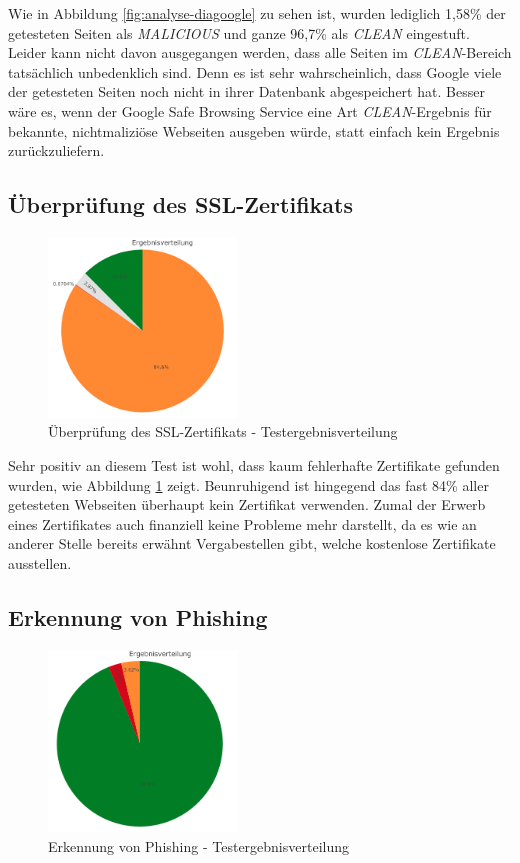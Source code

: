 Wie in Abbildung \ref{fig:analyse-diagoogle} zu sehen ist, wurden lediglich 1,58\% der
getesteten Seiten als \textit{MALICIOUS} und ganze 96,7\% als \textit{CLEAN} eingestuft.
Leider kann nicht davon ausgegangen werden, dass alle Seiten im \textit{CLEAN}-Bereich tatsächlich unbedenklich sind.
Denn es ist sehr wahrscheinlich, dass Google viele der getesteten Seiten noch nicht in ihrer Datenbank abgespeichert hat.
Besser wäre es, wenn der Google Safe Browsing Service eine Art \textit{CLEAN}-Ergebnis für bekannte, nichtmaliziöse Webseiten ausgeben würde, statt einfach kein Ergebnis zurückzuliefern. 

\subsection{Überprüfung des SSL-Zertifikats}
\begin{figure}[H]
  \centering
  \includegraphics[width=5cm]{images/stats/diacertificate}
  \caption{Überprüfung des SSL-Zertifikats - Testergebnisverteilung}
  \label{fig:analyse-diacertificate}
\end{figure}

Sehr positiv an diesem Test ist wohl, dass kaum fehlerhafte Zertifikate gefunden wurden, wie
Abbildung \ref{fig:analyse-diacertificate} zeigt. Beunruhigend ist hingegend das fast 84\% aller getesteten Webseiten überhaupt kein Zertifikat verwenden. Zumal der Erwerb eines Zertifikates auch finanziell keine Probleme mehr darstellt, da es wie an anderer Stelle bereits erwähnt Vergabestellen gibt, welche kostenlose Zertifikate ausstellen.

\subsection{Erkennung von Phishing}
\begin{figure}[H]
  \centering
  \includegraphics[width=5cm]{images/stats/diaphishing}
  \caption{Erkennung von Phishing - Testergebnisverteilung}
  \label{fig:analyse-diaphishing}
\end{figure}


